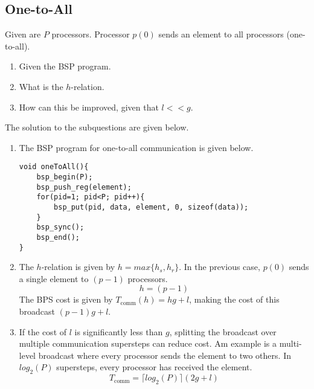 \documentclass[../main.tex]{subfiles}
\begin{document}
\subsection{One-to-All}
\begin{question}
Given are $P$ processors. Processor $p(0)$ sends an element to all processors (one-to-all).
\begin{enumerate}
	\item Given the BSP program.
	\item What is the $h$-relation.
	\item How can this be improved, given that $l << g$.
\end{enumerate}
\end{question}
\begin{solution} The solution to the subquestions are given below.
\begin{enumerate}
	\item The BSP program for one-to-all communication is given below.
\begin{lstlisting}
void oneToAll(){
	bsp_begin(P);
	bsp_push_reg(element);
	for(pid=1; pid<P; pid++){
		bsp_put(pid, data, element, 0, sizeof(data));
	}
	bsp_sync();
	bsp_end();
}
\end{lstlisting}
	\item The $h$-relation is given by $h = max\{h_s,h_r\}$. In the previous case, $p(0)$ sends a single element to
	$(p-1)$ processors.
	\begin{equation}
		h = (p - 1)
	\end{equation}
	The BPS cost is given by $T_\text{comm}(h) = hg + l$, making the cost of this broadcast $(p-1)g + l$.
	\item If the cost of $l$ is significantly less than $g$, splitting the broadcast over multiple communication
	supersteps can reduce cost. Am example is a multi-level broadcast where every processor sends the element to two
	others. In $log_2(P)$ supersteps, every processor has received the element.
	\begin{equation}
		T_\text{comm} = \lceil log_2(P) \rceil (2g + l)
	\end{equation}
\end{enumerate}


\end{solution}
\end{document}

